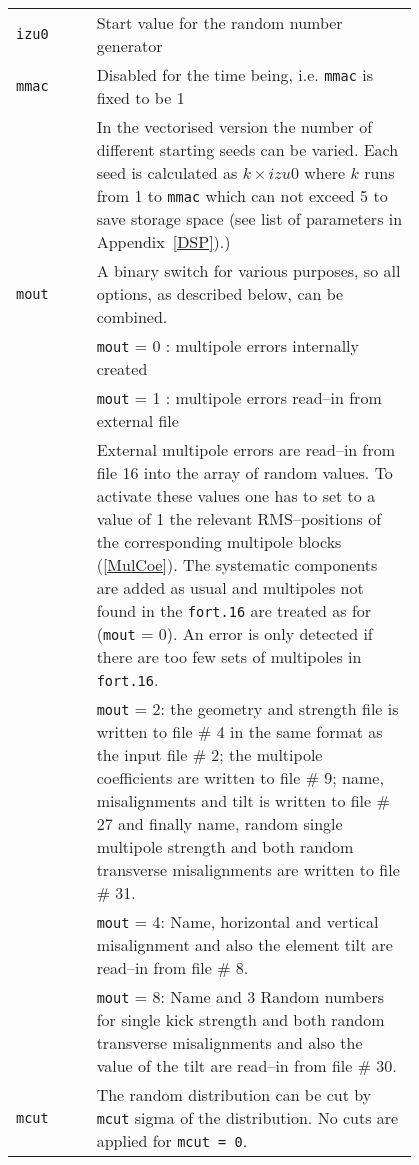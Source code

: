 \bigskip
\begin{tabular}{@{}lp{0.8\linewidth}}
    \texttt{izu0} & Start value for the random number generator \\
    \texttt{mmac} & {\color{notered} Disabled for the time being, i.e. \texttt{mmac} is fixed to be 1} \\
                  & In the vectorised version the number of different starting seeds can be varied. Each seed is calculated as \mbox{$ k \times izu0 $} where $k$ runs from 1 to \texttt{mmac} which can not exceed 5 to save storage space (see    list of parameters in Appendix~\ref{DSP}).) \\
    \texttt{mout} & A binary switch for various purposes, so all options, as described below, can be combined. \\
                  & \texttt{mout} = 0 : multipole errors internally created \\
                  & \texttt{mout} = 1 : multipole errors read--in from external file \\
                  & External multipole errors are read--in from file 16 into the array of random values. To activate these values one has to set to a value of 1 the relevant RMS--positions of the corresponding multipole blocks (\ref{MulCoe}). The systematic components are added as usual and multipoles not found in the \texttt{fort.16} are treated as for (\texttt{mout} = 0). An error is only detected if there are too few sets of multipoles in \texttt{fort.16}. \\
                  & \texttt{mout} = 2: the geometry and strength file is written to file \# 4 in the same format as the input file \# 2; the multipole coefficients are written to file \# 9; name, misalignments and tilt is written to file \# 27 and finally name, random single multipole  strength and both random transverse misalignments are written to  file \# 31.\\
                  & \texttt{mout} = 4: Name, horizontal and vertical misalignment and also the element tilt are read--in from file \# 8.\\
                  & \texttt{mout} = 8: Name and 3 Random numbers for single kick strength and both random transverse misalignments and also the value of the tilt are read--in from file \# 30. \\
    \texttt{mcut} & The random distribution can be cut by \texttt{mcut} sigma of the distribution. No cuts are applied for \texttt{mcut = 0}.
\end{tabular}

